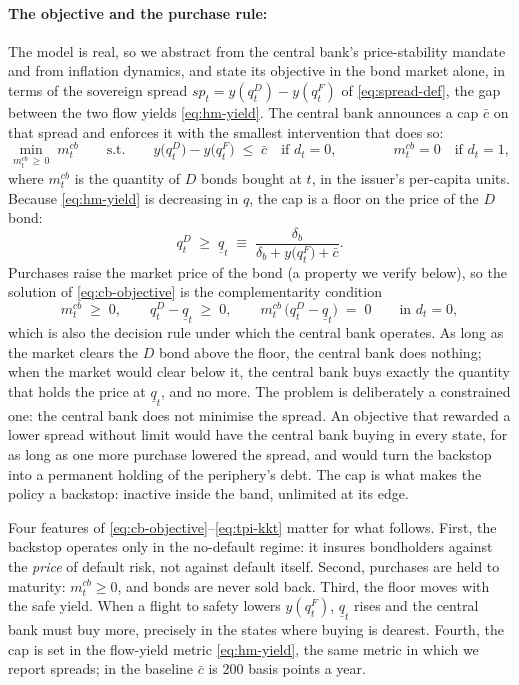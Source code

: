 \paragraph{The objective and the purchase rule:}
The model is real, so we abstract from the central bank's price-stability
mandate and from inflation dynamics, and state its objective in the bond market
alone, in terms of the sovereign spread $sp_t=y(q^{D}_t)-y(q^{F}_t)$ of
\eqref{eq:spread-def}, the gap between the two flow yields \eqref{eq:hm-yield}.
The central bank announces a cap $\bar c$ on that spread and enforces it with the
smallest intervention that does so:
\begin{equation}
\min_{m^{cb}_t\,\ge\,0}\;m^{cb}_t
\qquad\text{s.t.}\qquad
y\bigl(q^{D}_t\bigr)-y\bigl(q^{F}_t\bigr)\;\le\;\bar c
\quad\text{if } d_t=0,
\qquad\qquad
m^{cb}_t=0\quad\text{if } d_t=1,
\label{eq:cb-objective}
\end{equation}
where $m^{cb}_t$ is the quantity of $D$ bonds bought at $t$, in the issuer's
per-capita units. Because \eqref{eq:hm-yield} is decreasing in $q$, the cap is a
floor on the price of the $D$ bond:
\begin{equation}
q^{D}_t\;\ge\;\underline q_t\;\equiv\;\frac{\delta_b}{\delta_b+y\bigl(q^{F}_t\bigr)+\bar c}.
\label{eq:tpi-floor}
\end{equation}
Purchases raise the market price of the bond (a property we verify below), so
the solution of \eqref{eq:cb-objective} is the complementarity condition
\begin{equation}
m^{cb}_t\;\ge\;0,
\qquad
q^{D}_t-\underline q_t\;\ge\;0,
\qquad
m^{cb}_t\,\bigl(q^{D}_t-\underline q_t\bigr)\;=\;0
\qquad\text{in } d_t=0,
\label{eq:tpi-kkt}
\end{equation}
which is also the decision rule under which the central bank operates. As long as
the market clears the $D$ bond above the floor, the central bank does nothing;
when the market would clear below it, the central bank buys exactly the quantity
that holds the price at $\underline q_t$, and no more. The problem is
deliberately a constrained one: the central bank does not minimise the spread.
An objective that rewarded a lower spread without limit would have the central
bank buying in every state, for as long as one more purchase lowered the spread,
and would turn the backstop into a permanent holding of the periphery's debt.
The cap is what makes the policy a backstop: inactive inside the band,
unlimited at its edge.

Four features of \eqref{eq:cb-objective}--\eqref{eq:tpi-kkt} matter for what
follows. First, the backstop operates only in the no-default regime: it insures
bondholders against the \emph{price} of default risk, not against default
itself. Second, purchases are held to maturity: $m^{cb}_t\ge0$, and bonds are
never sold back. Third, the floor moves with the safe yield. When a flight to
safety lowers $y(q^{F}_t)$, $\underline q_t$ rises and the central bank must buy
more, precisely in the states where buying is dearest. Fourth, the cap is set in
the flow-yield metric \eqref{eq:hm-yield}, the same metric in which we report
spreads; in the baseline $\bar c$ is 200 basis points a year.

